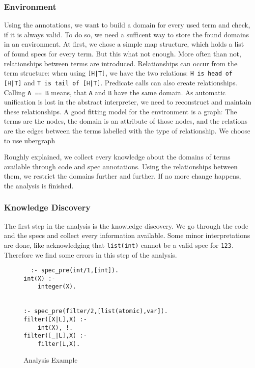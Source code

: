 \documentclass[a4paper]{article}
\begin{document}
\subsubsection{Environment}
Using the annotations, we want to build a domain for every used term and check,
if it is always valid. To do so, we need a sufficent way to store the found
domains in an environment. At first, we chose a simple map structure, which holds a list of found
specs for every term. But this what not enough.
More often than not, relationships between terms are introduced. Relationships
can occur from the term structure:
when using \texttt{[H|T]}, we have the two relations: \texttt{H is head of
  [H|T]} and \texttt{T is tail of [H|T]}.
Predicate calls can also create relationships. Calling \texttt{A == B} means,
that \texttt{A} and \texttt{B} have the same domain.
As automatic unification is lost in the abstract interpreter, we need to
reconstruct and maintain these relationships.
A good fitting model for the environment is a graph: The terms are the nodes,
the domain is an attribute of those nodes, and the relations are the edges
between the terms labelled with the type of relationship.
We choose to use \hyperlink{https://github.com/Engelberg/ubergraph}{ubergraph}


Roughly explained, we collect every knowledge about the domains of terms
available through code and spec annotations. Using the relationships between
them, we restrict the domains further and further. If no more change happens, the analysis
is finished.

\subsubsection{Knowledge Discovery}
The first step in the analysis is the knowledge discovery. We go through the
code and the specs and collect every information available. Some minor
interpretations are done, like acknowledging that \texttt{list(int)} cannot be a
valid spec for \texttt{123}. Therefore we find some errors in this step of the
analysis.

\begin{figure}
  \caption{Analysis Example}
  \label{example:analysis}
\begin{lstlisting}
  :- spec_pre(int/1,[int]).
int(X) :-
    integer(X).


:- spec_pre(filter/2,[list(atomic),var]).
filter([X|L],X) :-
    int(X), !.
filter([_|L],X) :-
    filter(L,X).
\end{lstlisting}
\end{figure}
\end{document}
